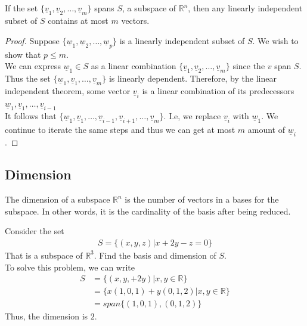 \documentclass[a4paper]{article}
\theoremstyle{plain}
\newtheorem{thm}{Theorem}[section]
\theoremstyle{definition}
\newtheorem{defn}{Definition}[section]
\newtheorem{exmp}{Example}[section]
\theoremstyle{remark}
\begin{document}
\begin{tcolorbox}[colback=black!3!white,colframe=black!60!white,title=\begin{thm}At most m vectors \label{At most m vectors}\end{thm}]
	If the set $\{ \underline{v}_1, \underline{v}_2, \ldots , \underline{v}_m \}$ spans $S$, a subspace of $\mathbb{R}^{n}$, then any linearly independent subset of $S$ contains at most $m$ vectors.
	\begin{proof}
		Suppose $\{ \underline{w}_1, \underline{w}_2, \ldots , \underline{w} _p \}$ is a linearly independent subset of $S$. We wish to show that $p \le  m$. \\
		We can express $\underline{w}_1 \in S$ as a linear combination $\{\underline{v}_1, \underline{v}_2, \ldots, \underline{v}_m \}$ since the $v$ span $S$. \\
		Thus the set $\{\underline{w}_1, \underline{v}_1, \ldots , \underline{v}_m \}$ is linearly dependent.
		Therefore, by the linear independent theorem, some vector $\underline{v}_i$ is a linear combination of its predecessors $\underline{w}_1,\underline{v}_1, \ldots, \underline{v}_{i-1}$ \\
		It follows that $\{ \underline{w}_1, \underline{v}_1, \ldots , \underline{v}_{i-1}, \underline{v}_{i+1},\ldots,\underline{v}_m \}$. I.e, we replace $ \underline{v}_i$ with $\underline{w}_1$.
		We continue to iterate the same steps and thus we can get at most $m$ amount of $\underline{w}_i$.
	\end{proof}
\end{tcolorbox}
\subsection{Dimension}
\begin{tcolorbox}[colback=black!3!white,colframe=black!60!white,title=\begin{defn}Dimension \label{Dimension}\end{defn}]
The dimension of a subspace $\mathbb{R}^{n}$ is the number of vectors in a bases for the subspace. In other words, it is the cardinality of the basis after being reduced.
\end{tcolorbox}
\begin{tcolorbox}[colback=black!3!white,colframe=black!60!white,title=\begin{exmp}Example 1 \label{Example 1}\end{exmp}]
        Consider the set
                \begin{align}
                S = \{ (x,y,z) | x+2y-z=0 \}
                \end{align}
		That is a subspace of $\mathbb{R}^{3}$. Find the basis and dimension of $S$. \\
		To solve this problem, we can write
		\begin{align}
			S &= \{(x,y,+2y) | x,y \in \mathbb{R} \}\\
			  &= \{ x(1,0,1) + y(0,1,2) | x,y \in \mathbb{R} \} \\
			  &= span \{(1,0,1),(0,1,2) \}
		\end{align}
		Thus, the dimension is $2$.
\end{tcolorbox}
\end{document}
